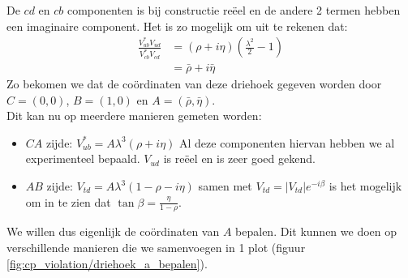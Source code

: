 \documentclass[../main.tex]{subfiles}
\begin{document}
De $cd$ en $cb$ componenten is bij constructie reëel en de andere 2 termen hebben een imaginaire component. Het is zo mogelijk om uit te rekenen dat:
\begin{equation}
    \begin{aligned}
        \label{eq:driehoeksvoorstelling_mat_vermenigvuldiging}
        \frac{V_{u b}^{*} V_{u d}}{V_{c b}^{*} V_{c d}} &=(\rho+i \eta)\left(\frac{\lambda^{2}}{2}-1\right) \\
                                                        &=\bar{\rho}+i \bar{\eta}
    \end{aligned}
\end{equation}
Zo bekomen we dat de coördinaten van deze driehoek gegeven worden door $C=(0,0)$, $B=(1,0)$ en $A=(\bar{\rho}, \bar{\eta})$.\\
Dit kan nu op meerdere manieren gemeten worden:
\begin{itemize}
    \item $CA$ zijde: $V_{u b}^{*}=A \lambda^{3}(\rho+i \eta)$ Al deze componenten hiervan hebben we al experimenteel bepaald. $V_{ud}$ is reëel en is zeer goed gekend.
    \item $AB$ zijde: $V_{t d}=A \lambda^{3}(1-\rho-i \eta)$ samen met $V_{t d}=\left|V_{t d}\right| e^{-i \beta}$ is het mogelijk om in te zien dat $\tan \beta=\frac{\eta}{1-\rho}$.
\end{itemize}
We willen dus eigenlijk de coördinaten van $A$ bepalen. Dit kunnen we doen op verschillende manieren die we samenvoegen in 1 plot (figuur \ref{fig:cp_violation/driehoek_a_bepalen}).
\end{document}
